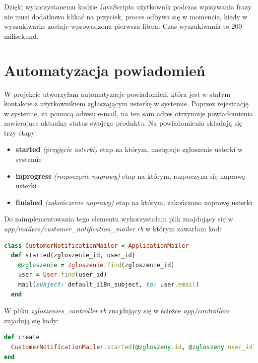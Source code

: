 \documentclass[openright]{xmgr}
\begin{document}
	Dzięki wykorzystanemu kodzie JavaScripts użytkownik podczas wpisywania frazy nie musi dodatkowo klikać na przycisk, proces odbywa się w momencie, kiedy w wyszukiwarke zostaje wprowadzona pierwsza litera. Czas wyszukiwania to 200 milisekund. 
	\newpage
	\section{Automatyzacja powiadomień}
	
	W projekcie utworzyłam automatyzacje powiadomień, która jest w stałym kontakcie z użytkownikiem zgłaszającym usterkę w systemie. Poprzez rejestrację w systemie, za pomocą adresu e-mail, na ten sam adres otrzymuje powiadomienia zawierające aktualny status swojego produktu. Na powiadomienia składają się trzy etapy:
	
	\begin{itemize}
		\item
		\textbf{started} \textit{(przyjęcie usterki)} etap na którym, następuje zgłoszenie usterki w systemie
		
		\item
		\textbf{inprogress} \textit{(rozpoczęcie naprawy)} etap na którym, rozpoczyna się naprawę usterki
		
		\item
		\textbf{finished} \textit{(zakończenie naprawy)} etap na którym, zakończono naprawę usterki
	\end{itemize}
	
	Do zaimplementowania tego elementu wykorzystałam plik znajdujący się w \textit{app/mailers/customer\_notification\_mailer.rb} w którym zawarłam kod:
	
	\begin{lstlisting}[language=Ruby,lineskip={-1pt},caption=Opis statusów w modelu]
class CustomerNotificationMailer < ApplicationMailer
  def started(zgloszenie_id, user_id)
	@zgloszenie = Zgloszenie.find(zgloszenie_id)
	user = User.find(user_id)
	mail(subject: default_i18n_subject, to: user.email) 
  end
	\end{lstlisting} 
	
	W pliku \textit{zgłoszenies\_controller.rb} znajdujący się w ścieżce
	\textit{app/controllers} znjadują się kody:
	
	\begin{lstlisting}[language=Ruby,lineskip={-1pt},caption=Powiadomienia o przyjęciu usterki do naprawy]
def create
  CustomerNotificationMailer.started(@zgloszeny.id, @zgloszeny.user_id).deliver_later
end
	\end{lstlisting}
	
\end{document}
